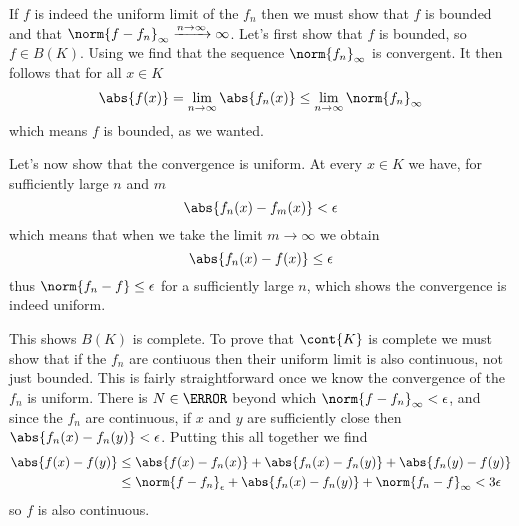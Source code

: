 \documentclass[12pt,oneside]{book}
\begin{document}
If \( f \) is indeed the uniform limit of the \( f_n \) then we must show that \( f \) is
bounded and that \( \norm{f - f_n}_\infty \xrightarrow{n \to \infty} \infty \). Let's
first show that \( f \) is bounded, so \( f \in B(K) \). Using  we find that the sequence \( \norm{f_n}_\infty \) is convergent. It then follows that for all \( x \in K \)
\begin{equation*}
	\abs{f(x)} = \lim_{n \to \infty} \abs{f_n(x)} \leq \lim_{n \to \infty}
	\norm{f_n}_\infty
\end{equation*}
which means \( f \) is bounded, as we wanted.

Let's now show that the convergence is uniform. At every \( x \in K \) we have, for
sufficiently large \( n \) and \( m \)
\begin{equation*}
	\abs{f_n(x) - f_m(x)} < \epsilon
\end{equation*}
which means that when we take the limit \( m \to \infty \) we obtain
\begin{equation*}
	\abs{f_n(x) - f(x)} \leq \epsilon
\end{equation*}
thus \( \norm{f_n - f} \leq \epsilon \) for a sufficiently large \( n \), which shows the
convergence is indeed uniform.

This shows \( B(K) \) is complete. To prove that \( \cont{K} \) is complete we must show
that if the \( f_n \) are contiuous then their uniform limit is also continuous, not just
bounded. This is fairly straightforward once we know the convergence of the \( f_n \) is
uniform. There is \( N \in \N \) beyond which \( \norm{f - f_n}_\infty < \epsilon \), and
since the \( f_n \) are continuous, if \( x \) and \( y \) are sufficiently close then \(
\abs{f_n(x) - f_n(y)} < \epsilon \). Putting this all together we find
\begin{align*}
	\abs{f(x) - f(y)} & \leq \abs{f(x) - f_n(x)} + \abs{f_n(x) - f_n(y)} + \abs{f_n(y) -
	f(y)} \\
										& \leq \norm{f - f_n}_\epsilon + \abs{f_n(x) - f_n(y)} + \norm{f_n -
										f}_\infty < 3\epsilon
\end{align*}
so \( f \) is also continuous.
\end{document}
